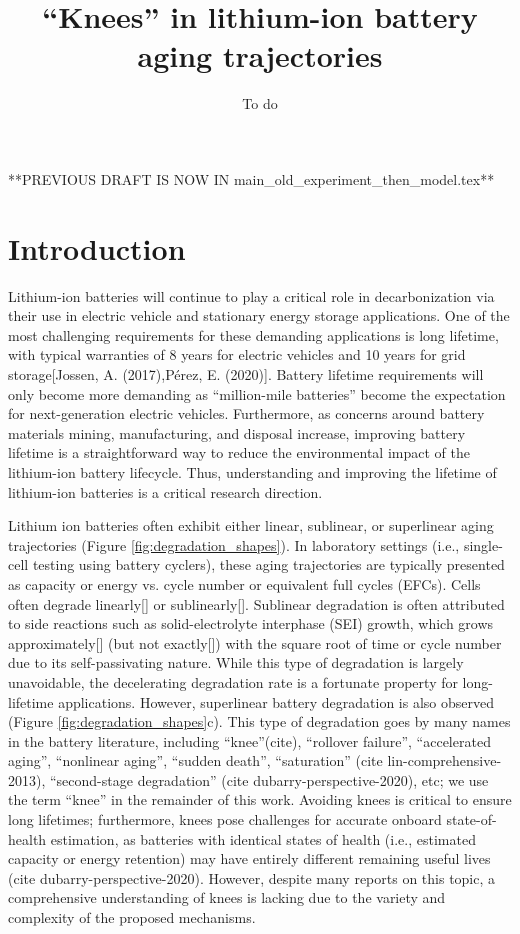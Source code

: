 \documentclass{article}
\title{``Knees'' in lithium-ion battery aging trajectories}
\author{To do}
\date{}
\begin{document}
\maketitle

**PREVIOUS DRAFT IS NOW IN main\_old\_experiment\_then\_model.tex**

\section{Introduction}

Lithium-ion batteries will continue to play a critical role in decarbonization via their use in electric vehicle and stationary energy storage applications. One of the most challenging requirements for these demanding applications is long lifetime, with typical warranties of 8 years for electric vehicles and 10 years for grid storage[Jossen, A. (2017),Pérez, E. (2020)]. Battery lifetime requirements will only become more demanding as “million-mile batteries” become the expectation for next-generation electric vehicles. Furthermore, as concerns around battery materials mining, manufacturing, and disposal increase, improving battery lifetime is a straightforward way to reduce the environmental impact of the lithium-ion battery lifecycle. Thus, understanding and improving the lifetime of lithium-ion batteries is a critical research direction.

Lithium ion batteries often exhibit either linear, sublinear, or superlinear aging trajectories (Figure \ref{fig:degradation_shapes}). In laboratory settings (i.e., single-cell testing using battery cyclers), these aging trajectories are typically presented as capacity or energy vs. cycle number or equivalent full cycles (EFCs). Cells often degrade linearly[] or sublinearly[]. Sublinear degradation is often attributed to side reactions such as solid-electrolyte interphase (SEI) growth, which grows approximately[] (but not exactly[]) with the square root of time or cycle number due to its self-passivating nature. While this type of degradation is largely unavoidable, the decelerating degradation rate is a fortunate property for long-lifetime applications. However, superlinear battery degradation is also observed (Figure \ref{fig:degradation_shapes}c). This type of degradation goes by many names in the battery literature, including ``knee''(cite), ``rollover failure''\cite{ma_editors_2019}, ``accelerated aging'', ``nonlinear aging''\cite{schuster_nonlinear_2015, bach_nonlinear_2016, yang_modeling_2017, mandli_analysis_2019, keil_linear_2019, atalay_theory_2020}, ``sudden death''\cite{muller_model-based_2019, willenberg_development_2020}, ``saturation'' (cite lin-comprehensive-2013), ``second-stage degradation'' (cite dubarry-perspective-2020), etc; we use the term ``knee'' in the remainder of this work. Avoiding knees is critical to ensure long lifetimes; furthermore, knees pose challenges for accurate onboard state-of-health estimation, as batteries with identical states of health (i.e., estimated capacity or energy retention) may have entirely different remaining useful lives (cite dubarry-perspective-2020). However, despite many reports on this topic, a comprehensive understanding of knees is lacking due to the variety and complexity of the proposed mechanisms.
\end{document}
